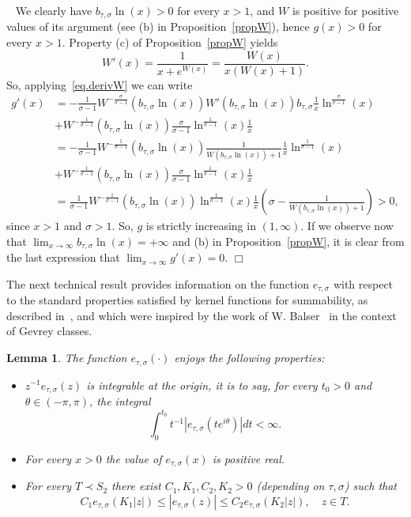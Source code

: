 \documentclass[12pt,leqno]{amsart}
\theoremstyle{plain}
\newtheorem{lemma}[theo]{Lemma}
\theoremstyle{definition}
\numberwithin{equation}{section}
\newenvironment{proof1}{\medskip\par\noindent{\bf Proof}\ \normalfont}{\hfill $\Box$
\medskip\par}
\begin{document}
\begin{proof1}
We clearly have $b_{\tau,\sigma}\ln(x)>0$ for every $x>1$, and $W$ is positive for positive values of its argument (see (b) in Proposition~\ref{propW}), hence $g(x)>0$ for every $x>1$. Property (c) of Proposition~\ref{propW} yields
\begin{equation}\label{eq.derivW}
W'(x)=\frac{1}{x+e^{W(x)}}=\frac{W(x)}{x(W(x)+1)}.
\end{equation}
So, applying~\eqref{eq.derivW} we can write
\begin{align*}
g'(x)&=-\frac{1}{\sigma-1}W^{-\frac{\sigma}{\sigma-1}}(b_{\tau,\sigma}\ln(x)) W'(b_{\tau,\sigma}\ln(x))b_{\tau,\sigma}\frac{1}{x}\ln^{\frac{\sigma}{\sigma-1}}(x)\\
&+W^{-\frac{1}{\sigma-1}}(b_{\tau,\sigma}\ln(x))\frac{\sigma}{\sigma-1} \ln^{\frac{1}{\sigma-1}}(x)\frac{1}{x}\\
&=-\frac{1}{\sigma-1}W^{-\frac{1}{\sigma-1}}(b_{\tau,\sigma}\ln(x)) \frac{1}{W(b_{\tau,\sigma}\ln(x))+1}\frac{1}{x}\ln^{\frac{1}{\sigma-1}}(x)\\
&+W^{-\frac{1}{\sigma-1}}(b_{\tau,\sigma}\ln(x))\frac{\sigma}{\sigma-1} \ln^{\frac{1}{\sigma-1}}(x)\frac{1}{x}\\
&=\frac{1}{\sigma-1}W^{-\frac{1}{\sigma-1}}(b_{\tau,\sigma}\ln(x)) \ln^{\frac{1}{\sigma-1}}(x)\frac{1}{x} \left(\sigma-\frac{1}{W(b_{\tau,\sigma}\ln(x))+1}\right)>0,
\end{align*}
since $x>1$ and $\sigma>1$. So, $g$ is strictly increasing in $(1,\infty)$. If we observe now that $\lim_{x\to\infty}b_{\tau,\sigma}\ln(x)=+\infty$ and (b) in Proposition~\ref{propW}, it is clear from the last expression that $\lim_{x\to\infty}g'(x)=0$.
\end{proof1}





The next technical result provides information on the function $e_{\tau,\sigma}$ with respect to the standard properties satisfied by kernel functions for summability, as described in~\cite{lastramaleksanzJMAA15}, and which were inspired by the work of W. Balser~\cite[Section~5.5]{balser} in the context of Gevrey classes.

\begin{lemma}\label{lema.Properties.e_h}
The function $e_{\tau,\sigma}(\cdot)$ enjoys the following properties:
\begin{itemize}
\item[1.] $z^{-1}e_{\tau,\sigma}(z)$ is integrable at the origin, it is to say, for every $t_0>0$ and $\theta\in(-\pi,\pi)$, the integral
$$\int_0^{t_0}t^{-1}|e_{\tau,\sigma}(te^{i\theta})|dt<\infty.$$
\item[2.] For every $x>0$ the value of $e_{\tau,\sigma}(x)$ is positive real.
\item[3.] For every $T\prec S_{2}$ there exist $C_1,K_1,C_2,K_2>0$ (depending on $\tau,\sigma$) such that
\begin{equation}\label{eq.Bounds_e_h_subsectors_real_axis}
C_1e_{\tau,\sigma}(K_1|z|)\le |e_{\tau,\sigma}(z)|\le C_2e_{\tau,\sigma}(K_2|z|),\quad z\in T.
\end{equation}
\end{itemize}
\end{lemma}
\end{document}

